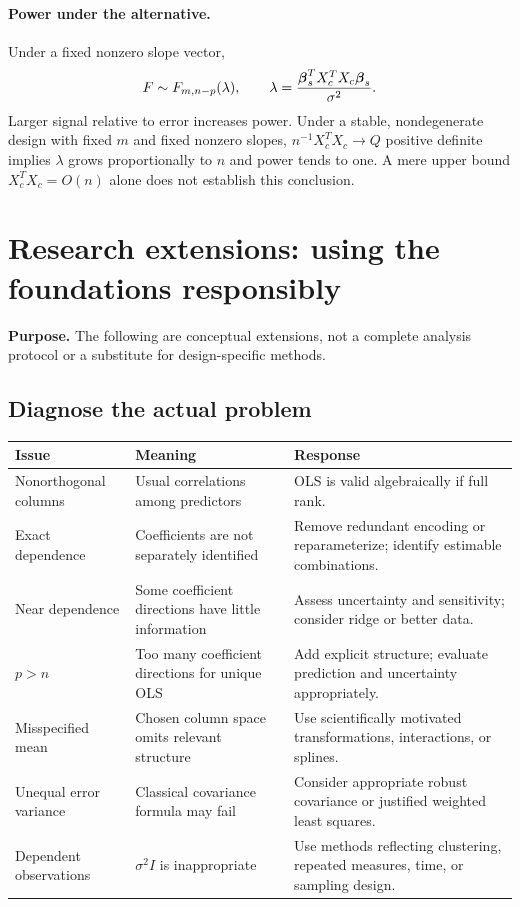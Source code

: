 \documentclass[11pt]{article}
\begin{document}
\paragraph{Power under the alternative.}
Under a fixed nonzero slope vector,
\[
F\sim F_{m,n-p}(\lambda),\qquad
\lambda=\frac{\boldsymbol\beta_s^TX_c^TX_c\boldsymbol\beta_s}{\sigma^2}.
\]
Larger signal relative to error increases power. Under a stable, nondegenerate design with fixed $m$ and fixed nonzero slopes, $n^{-1}X_c^TX_c\to Q$ positive definite implies $\lambda$ grows proportionally to $n$ and power tends to one. A mere upper bound $X_c^TX_c=O(n)$ alone does not establish this conclusion.

\newpage
\section*{Research extensions: using the foundations responsibly}
\textbf{Purpose.} The following are conceptual extensions, not a complete analysis protocol or a substitute for design-specific methods.

\subsection*{Diagnose the actual problem}
\begin{center}\small
\begin{tabular}{p{.23\linewidth}p{.30\linewidth}p{.37\linewidth}}\toprule
Issue&Meaning&Response\\\midrule
Nonorthogonal columns&Usual correlations among predictors&OLS is valid algebraically if full rank.\\
Exact dependence&Coefficients are not separately identified&Remove redundant encoding or reparameterize; identify estimable combinations.\\
Near dependence&Some coefficient directions have little information&Assess uncertainty and sensitivity; consider ridge or better data.\\
$p>n$&Too many coefficient directions for unique OLS&Add explicit structure; evaluate prediction and uncertainty appropriately.\\
Misspecified mean&Chosen column space omits relevant structure&Use scientifically motivated transformations, interactions, or splines.\\
Unequal error variance&Classical covariance formula may fail&Consider appropriate robust covariance or justified weighted least squares.\\
Dependent observations&$\sigma^2I$ is inappropriate&Use methods reflecting clustering, repeated measures, time, or sampling design.\\\bottomrule
\end{tabular}
\end{center}
\end{document}
